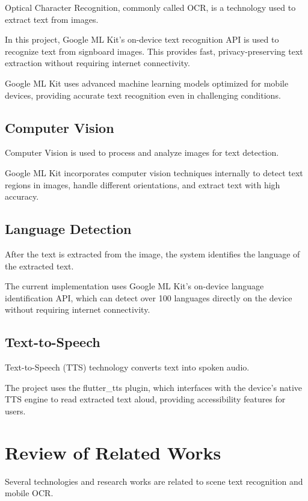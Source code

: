 \documentclass[12pt,a4paper]{report}
\begin{document}
Optical Character Recognition, commonly called OCR, is a technology used to extract text from images.

In this project, Google ML Kit's on-device text recognition API is used to recognize text from signboard images. This provides fast, privacy-preserving text extraction without requiring internet connectivity.

Google ML Kit uses advanced machine learning models optimized for mobile devices, providing accurate text recognition even in challenging conditions. \cite{ref4}

\subsection{Computer Vision}

Computer Vision is used to process and analyze images for text detection.

Google ML Kit incorporates computer vision techniques internally to detect text regions in images, handle different orientations, and extract text with high accuracy.

\subsection{Language Detection}

After the text is extracted from the image, the system identifies the language of the extracted text.

The current implementation uses Google ML Kit's on-device language identification API, which can detect over 100 languages directly on the device without requiring internet connectivity.

\subsection{Text-to-Speech}

Text-to-Speech (TTS) technology converts text into spoken audio.

The project uses the flutter\_tts plugin, which interfaces with the device's native TTS engine to read extracted text aloud, providing accessibility features for users.

\section{Review of Related Works}

Several technologies and research works are related to scene text recognition and mobile OCR.
\end{document}
